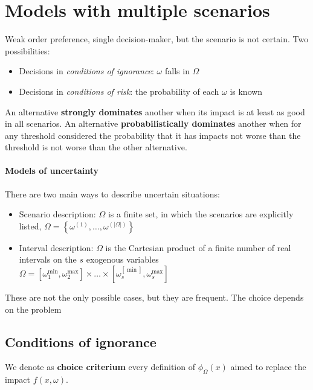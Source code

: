 \section{Models with multiple scenarios}

Weak order preference, single decision-maker, but the scenario is not certain. Two possibilities: 
\begin{itemize}
	\item Decisions in \textit{conditions of ignorance}: $\omega$ falls in $\Omega$
	
	\item Decisions in \textit{conditions of risk}: the probability of each $\omega$ is known
\end{itemize}

An alternative \textbf{strongly dominates} another when its impact is at least as good in all scenarios. An alternative \textbf{probabilistically dominates} another when for any threshold considered the probability that it has impacts not worse than the threshold is not worse than the other alternative.

\paragraph{Models of uncertainty} There are two main ways to describe uncertain situations: 
\begin{itemize}
	\item Scenario description: $\Omega$ is a finite set, in which the scenarios are explicitly listed, $\Omega = \left\{\omega^{(1)}, \dots, \omega^{(|\Omega|)}\right\}$
	
	\item Interval description: $\Omega$ is the Cartesian product of a finite number of real intervals on the $s$ exogenous variables $\Omega = [\omega_1^{\min}, \omega_2^{\max}] \times  \dots  \times [\omega_s^[\min], \omega_s^{\max}]$
\end{itemize}

These are not the only possible cases, but they are frequent. The choice depends on the problem

\subsection{Conditions of ignorance}

We denote as \textbf{choice criterium} every definition of $\phi_\Omega (x)$ aimed to replace the impact $f(x, \omega)$.

